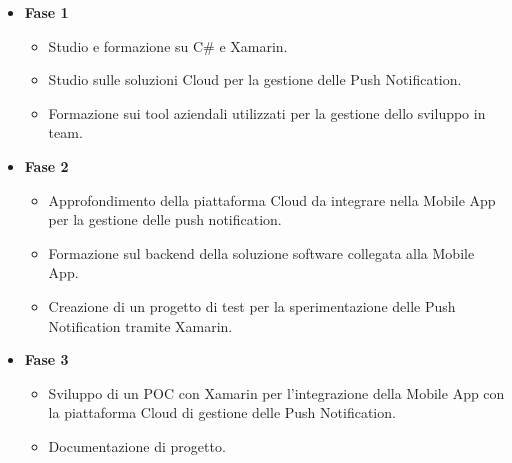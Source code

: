 {\begin{itemize}
        \item \textbf{Fase 1}
        \begin{itemize}
            \item Studio e formazione su C\# e Xamarin.
            \item Studio sulle soluzioni Cloud per la gestione delle Push Notification.
            \item Formazione sui tool aziendali utilizzati per la gestione dello sviluppo in team.
        \end{itemize}
        \item \textbf{Fase 2}
        \begin{itemize}
            \item Approfondimento della piattaforma Cloud da integrare nella Mobile App per la gestione delle push notification.
            \item Formazione sul backend della soluzione software collegata alla Mobile App.
            \item Creazione di un progetto di test per la sperimentazione delle Push Notification tramite Xamarin.
        \end{itemize}
        \item \textbf{Fase 3}
        \begin{itemize}
            \item Sviluppo di un POC con Xamarin per l’integrazione della Mobile App con la piattaforma Cloud di gestione delle Push Notification.
            \item Documentazione di progetto.
        \end{itemize}
    \end{itemize}
}

\newcommand{\totaleOre}{320}

\newcommand{\obiettiviObbligatori}{
     \item \underline{\textit{O01}}: Studio delle possibili piattaforme Cloud per la gestione delle Push Notification.  
	 \item \underline{\textit{O02}}: Selezione della piattaforma Cloud che ai requisiti della Mobile App e dal dominio applicativo specifico.
	 \item \underline{\textit{O03}}: Sperimentazione dell'integrazione con la Mobile App in Xamarin.
	 \item \underline{\textit{O04}}: Sviluppo di un POC di gestione delle Push Notification all'interno della Mobile App. 
}

\newcommand{\obiettiviDesiderabili}{
    \item Nessun obiettivo desiderabile.
}

\newcommand{\obiettiviFacoltativi}{
    \item Nessun obiettivo facoltativo.
}